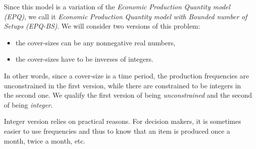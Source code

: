 

\medskip


Since this model is a variation of the \emph{Economic Production Quantity model (EPQ)}, we call it \emph{Economic Production Quantity model with Bounded number of Setups (EPQ-BS)}.
We will consider two versions of this problem:
\begin{itemize}
  \item the cover-sizes can be any nonnegative real numbers,
  \item the cover-sizes have to be inverses of integers.
\end{itemize}
In other words, since a cover-size is a time period, the production frequencies are unconstrained in the first version, while there are constrained to be integers in the second one.
We qualify the first version of being {\em unconstrained} and the second of being {\em integer}.


Integer version relies on practical reasons.
For decision makers, it is sometimes easier to use frequencies and thus to know that an item is produced once a month, twice a month, etc.


